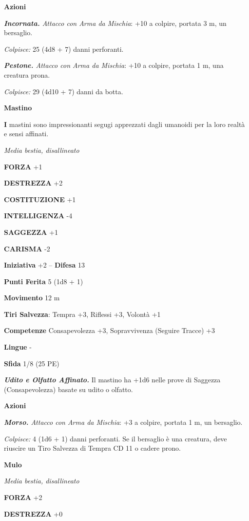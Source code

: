 \begin{multicols}{2}
\textbf{Azioni}

\emph{\textbf{Incornata.} Attacco con Arma da Mischia}: +10 a colpire, portata 3 m, un bersaglio.

\emph{Colpisce:} 25 (4d8 + 7) danni perforanti. 

\emph{\textbf{Pestone.} Attacco con Arma da Mischia}: +10 a colpire, portata 1 m, una creatura prona.

\emph{Colpisce:} 29 (4d10 + 7) danni da botta.

\medskip\textbf{Mastino}

\textbf{I} mastini sono impressionanti segugi apprezzati dagli umanoidi per la loro realtà e sensi affinati.

\emph{Media bestia, disallineato}

\textbf{FORZA} +1

\textbf{DESTREZZA} +2

\textbf{COSTITUZIONE} +1

\textbf{INTELLIGENZA} -4

\textbf{SAGGEZZA} +1

\textbf{CARISMA} -2

\textbf{Iniziativa} +2 -- \textbf{Difesa} 13

\textbf{Punti Ferita} 5 (1d8 + 1)

\textbf{Movimento} 12 m

\textbf{Tiri Salvezza}: Tempra +3, Riflessi +3, Volontà +1 

\textbf{Competenze} Consapevolezza +3, Sopravvivenza (Seguire Tracce) +3

\textbf{Lingue} -

\textbf{Sfida} 1/8 (25 PE)

\emph{\textbf{Udito e Olfatto Affinato.}} Il mastino ha +1d6 nelle prove di Saggezza (Consapevolezza) basate su udito o olfatto.

\textbf{Azioni}

\emph{\textbf{Morso.} Attacco con Arma da Mischia}: +3 a colpire, portata 1 m, un bersaglio.

\emph{Colpisce:} 4 (1d6 + 1) danni perforanti. Se il bersaglio è una creatura, deve riuscire un Tiro Salvezza di Tempra CD 11 o cadere prono.

\medskip\textbf{Mulo}

\emph{Media bestia, disallineato}

\textbf{FORZA} +2

\textbf{DESTREZZA} +0


\end{multicols}
